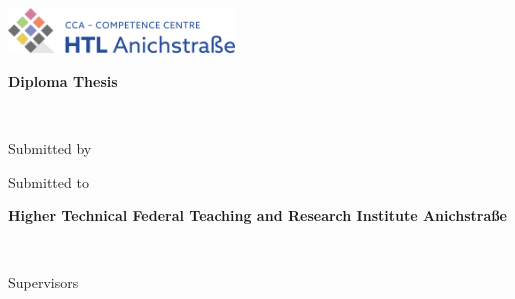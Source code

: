 
\newcommand{\myworktitle}{Diploma Thesis}  %
\newcommand{\myuniversity}{Higher Technical Federal Teaching and Research Institute Anichstraße} %
\newcommand{\mysubmissiontown}{Innsbruck}

\begin{titlepage}

{\sffamily

\begin{center}


\includegraphics[width=60mm]{figures/htl-logo}

\vfill\vfill\vfill
\vspace{1cm}
{\LARGE\bfseries\myworktitle}

\vfill\vfill\vfill

{\Large\bfseries\mytitle} \\
\mysubtitle

\vfill\vfill\vfill
\vfill\vfill\vfill



\vfill\vfill\vfill

\vspace{1cm}
Submitted by

{\bfseries\large\myauthor}
\vfill\vfill\vfill

\vspace{0.5cm}
Submitted to

\vfill

{\bfseries\large\myuniversity}
\vfill

\myinstitute\\

\vfill\vfill\vfill

\vspace{0.5cm}
Supervisors

\mysupervisor




\end{center}}
\end{titlepage}
